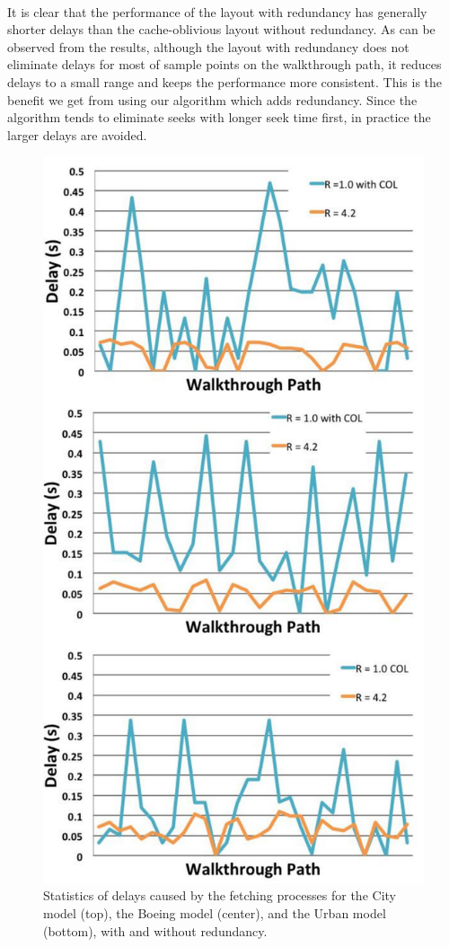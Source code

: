\\
It is clear that the performance of the layout with redundancy has generally shorter delays than the cache-oblivious layout without redundancy. As can be observed from the results, although the layout with redundancy does not eliminate delays for most of sample points on the walkthrough path, it reduces delays to a small range and keeps the performance more consistent. This is the benefit we get from using our algorithm which adds redundancy. Since the algorithm tends to eliminate seeks with longer seek time first, in practice the larger delays are avoided.
\begin{figure}[ht]
\centering
\includegraphics[width=\columnwidth]
{comparison_to_COL_all.pdf}
  \caption{Statistics of delays caused by the fetching processes for the City model (top), the Boeing model (center), and
the Urban model (bottom), with and without redundancy. }
  \label{fig:resultall}
\end{figure} 

